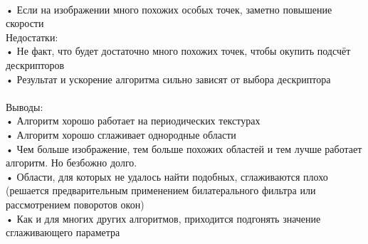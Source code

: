\documentclass[a4paper,12pt]{article}
\begin{document}
\\•	Если на изображении много похожих особых точек, заметно повышение скорости
\\
\newpage
Недостатки:
\\•	Не факт, что будет достаточно много похожих точек, чтобы окупить подсчёт дескрипторов
\\•	Результат и ускорение алгоритма сильно зависят от выбора дескриптора
\\
\\
Выводы:
\\•	Алгоритм хорошо работает на периодических текстурах
\\•	Алгоритм хорошо сглаживает однородные области
\\•	Чем больше изображение, тем больше похожих областей и тем лучше работает алгоритм. Но безбожно долго.
\\•	Области, для которых не удалось найти подобных, сглаживаются плохо (решается предварительным применением билатерального фильтра или рассмотрением поворотов окон)
\\•	Как и для многих других алгоритмов, приходится подгонять значение сглаживающего параметра
\newpage
\end{document}
